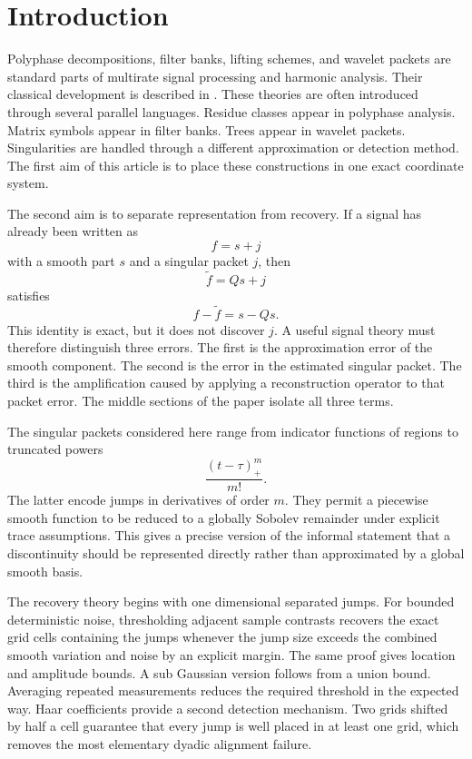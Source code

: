 \documentclass[11pt,letterpaper]{article}
\theoremstyle{plain}
\theoremstyle{plain}
\theoremstyle{plain}
\theoremstyle{definition}
\theoremstyle{definition}
\theoremstyle{definition}
\theoremstyle{definition}
\theoremstyle{remark}
\theoremstyle{remark}
\theoremstyle{remark}
\theoremstyle{remark}
\begin{document}
\section{Introduction}\label{extension:section:01}\label{sec:introduction}

Polyphase decompositions, filter banks, lifting schemes, and wavelet packets are standard parts of multirate signal processing and harmonic analysis. Their classical development is described in \cite{CrochiereRabiner1983,Vaidyanathan1993,VetterliKovacevic1995,StrangNguyen1996,Daubechies1992,Mallat2009}. These theories are often introduced through several parallel languages. Residue classes appear in polyphase analysis. Matrix symbols appear in filter banks. Trees appear in wavelet packets. Singularities are handled through a different approximation or detection method. The first aim of this article is to place these constructions in one exact coordinate system.

The second aim is to separate representation from recovery. If a signal has already been written as
\[
f=s+j
\]
with a smooth part \(s\) and a singular packet \(j\), then
\[
\widetilde f=Qs+j
\]
satisfies
\[
f-\widetilde f=s-Qs.
\]
This identity is exact, but it does not discover \(j\). A useful signal theory must therefore distinguish three errors. The first is the approximation error of the smooth component. The second is the error in the estimated singular packet. The third is the amplification caused by applying a reconstruction operator to that packet error. The middle sections of the paper isolate all three terms.

The singular packets considered here range from indicator functions of regions to truncated powers
\[
\frac{(t-\tau)_+^m}{m!}.
\]
The latter encode jumps in derivatives of order \(m\). They permit a piecewise smooth function to be reduced to a globally Sobolev remainder under explicit trace assumptions. This gives a precise version of the informal statement that a discontinuity should be represented directly rather than approximated by a global smooth basis.

The recovery theory begins with one dimensional separated jumps. For bounded deterministic noise, thresholding adjacent sample contrasts recovers the exact grid cells containing the jumps whenever the jump size exceeds the combined smooth variation and noise by an explicit margin. The same proof gives location and amplitude bounds. A sub Gaussian version follows from a union bound. Averaging repeated measurements reduces the required threshold in the expected way. Haar coefficients provide a second detection mechanism. Two grids shifted by half a cell guarantee that every jump is well placed in at least one grid, which removes the most elementary dyadic alignment failure.
\end{document}
